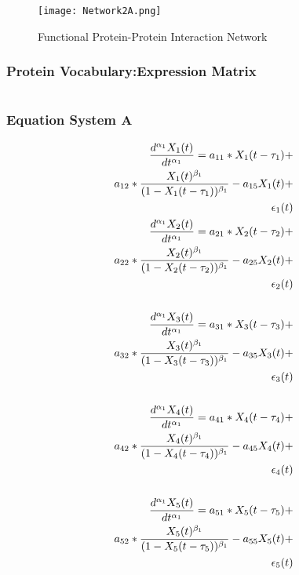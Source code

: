 \begin{figure}[H]
	\centering
	\begin{minipage}[b]{1\linewidth}
		\texttt{[image: Network2A.png]}
	\end{minipage}\hfill
	\caption{Functional Protein-Protein Interaction Network}
	\label{fig:Figure1}
\end{figure} 


\subsubsection{Protein Vocabulary:Expression Matrix}

\begin{equation}
\end{equation}


\subsubsection{Equation System A}

\begin{align*} 
\tiny
\frac{d^{\alpha_1}X_1(t)}{dt^{\alpha_1}} = a_{11} *X_1(t - \tau_1) + \\
a_{12} *\frac{X_1(t)^{\beta_1}}{(1-X_1(t - \tau_1))^{\beta_1}} - a_{15}X_1(t) + \\
\epsilon_1(t) \\
\frac{d^{\alpha_1}X_2(t)}{dt^{\alpha_1}} = a_{21} *X_2(t - \tau_2) + \\
a_{22} *\frac{X_2(t)^{\beta_1}}{(1-X_2(t - \tau_2))^{\beta_1}} - a_{25}X_2(t) + \\
\epsilon_2(t) \\ \\
\frac{d^{\alpha_1}X_3(t)}{dt^{\alpha_1}} = a_{31} *X_3(t - \tau_3) + \\
a_{32} *\frac{X_3(t)^{\beta_1}}{(1-X_3(t - \tau_3))^{\beta_1}} - a_{35}X_3(t) + \\
\epsilon_3(t) \\ \\
\frac{d^{\alpha_1}X_4(t)}{dt^{\alpha_1}} = a_{41} *X_4(t - \tau_4) + \\
a_{42} *\frac{X_4(t)^{\beta_1}}{(1-X_4(t - \tau_4))^{\beta_1}} - a_{45}X_4(t) + \\
\epsilon_4(t) \\ \\
\frac{d^{\alpha_1}X_5(t)}{dt^{\alpha_1}} = a_{51} *X_5(t - \tau_5) + \\
a_{52} *\frac{X_5(t)^{\beta_1}}{(1-X_5(t - \tau_5))^{\beta_1}} - a_{55}X_5(t) + \\
\epsilon_5(t) \\
\end{align*}

